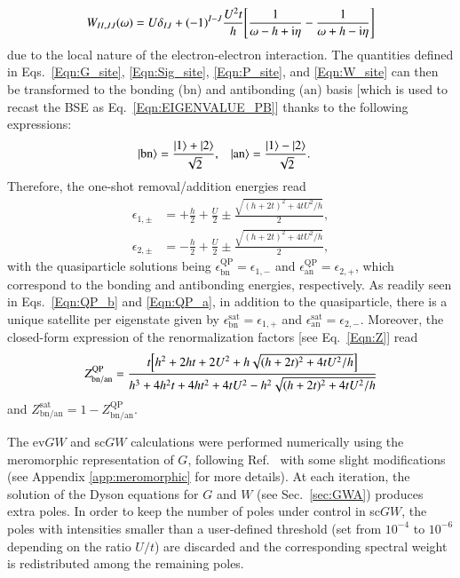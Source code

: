 \documentclass[aps,prb,reprint,superscriptaddress]{revtex4-1}
\newcommand{\STEcommc}[1]{{\color{blue} #1}}
\newcommand{\STEcomm}[1]{\STEcommc{(\underline{\bf SDS}: #1)}}
\newcommand{\eps}{\epsilon}
\newcommand{\I}{\text{i}}
\newcommand{\bn}{\text{bn}}
\newcommand{\an}{\text{an}}
\begin{document}
\begin{equation}
\label{Eqn:W_site}
    W_{II,JJ}(\omega)
    =U\delta_{IJ}+(-1)^{I-J}\frac{U^2t}{h}
    \qty[\frac{1}{\omega-h+\I\eta}-\frac{1}{\omega+h-\I\eta}]
\end{equation}
due to the local nature of the electron-electron interaction.
The quantities defined in Eqs.~\eqref{Eqn:G_site}, \eqref{Eqn:Sig_site}, \eqref{Eqn:P_site}, and \eqref{Eqn:W_site} can then be transformed to the bonding ($\bn$) and antibonding ($\an$) basis [which is used to recast the BSE as Eq.~\eqref{Eqn:EIGENVALUE_PB}] thanks to the following expressions:
\begin{align}
    \ket{\bn} & = \frac{\ket{1} + \ket{2}}{\sqrt{2}},
    &
    \ket{\an} & = \frac{\ket{1} - \ket{2}}{\sqrt{2}}.
\end{align}
Therefore, the one-shot removal/addition energies read
\begin{subequations}
\begin{align}
	\eps_{1,\pm} & = + \frac{h}{2} +  \frac{U}{2} \pm \frac{\sqrt{
	(h+2t)^2 + 4 t U^2/h}}{2},
	\label{Eqn:QP_b}
	\\
	\eps_{2,\pm} & =   -\frac{h}{2} +  \frac{U}{2} \pm \frac{\sqrt{
	(h+2t)^2+ 4 t U^2/h}}{2},
	\label{Eqn:QP_a}
\end{align}
\end{subequations}
with the quasiparticle solutions being $\eps_\bn^\text{QP}=\eps_{1,-}$ and $\eps_\an^\text{QP}=\eps_{2,+}$, which correspond to the bonding and antibonding energies, respectively.
As readily seen in Eqs.~\eqref{Eqn:QP_b} and \eqref{Eqn:QP_a}, in addition to the quasiparticle, there is a unique satellite per eigenstate given by $\eps_\bn^\text{sat}=\eps_{1,+}$ and $\eps_\an^\text{sat}=\eps_{2,-}$.
Moreover, the closed-form expression of the renormalization factors [see Eq.~\eqref{Eqn:Z}] read
\begin{equation}
\label{Eqn:Z_QP}
Z^{\text{QP}}_{\bn/\an}=\frac{t \qty[h^2 + 2 h t + 2 U^2 + h \sqrt{  (h + 2 t)^2 + 4 t U^2/h}]}{h^3 + 
 4 h^2 t + 4 h t^2 + 4 t U^2 - h^2 \sqrt{  (h + 2 t)^2 + 4 t U^2/h}  }  
\end{equation}
and $Z^{\text{sat}}_{\bn/\an}=1-Z^{\text{QP}}_{\bn/\an}$.

The ev$GW$ and sc$GW$ calculations were performed numerically using the meromorphic representation of $G$, following Ref.~\citep{vonFriesen_2010} with some slight modifications (see Appendix \ref{app:meromorphic} for more details).
At each iteration, the solution of the Dyson equations for $G$ and $W$ (see Sec.~\ref{sec:GWA}) produces extra poles. 
In order to keep the number of poles under control in sc$GW$, the poles with intensities smaller than a user-defined threshold (set from $10^{-4}$ to $10^{-6}$ depending on the ratio $U/t$) are discarded and the corresponding spectral weight is redistributed among the remaining poles.
\end{document}

